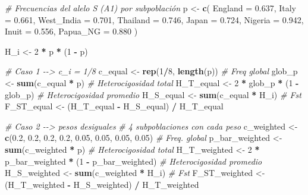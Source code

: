 \documentclass[
  11pt,
]{article}
\newenvironment{Shaded}{\begin{snugshade}}{\end{snugshade}}
\newcommand{\AttributeTok}[1]{\textcolor[rgb]{0.13,0.29,0.53}{#1}}
\newcommand{\CommentTok}[1]{\textcolor[rgb]{0.56,0.35,0.01}{\textit{#1}}}
\newcommand{\DecValTok}[1]{\textcolor[rgb]{0.00,0.00,0.81}{#1}}
\newcommand{\FloatTok}[1]{\textcolor[rgb]{0.00,0.00,0.81}{#1}}
\newcommand{\FunctionTok}[1]{\textcolor[rgb]{0.13,0.29,0.53}{\textbf{#1}}}
\newcommand{\NormalTok}[1]{#1}
\newcommand{\OtherTok}[1]{\textcolor[rgb]{0.56,0.35,0.01}{#1}}
\newcommand{\SpecialCharTok}[1]{\textcolor[rgb]{0.81,0.36,0.00}{\textbf{#1}}}
\begin{document}
\begin{Shaded}
\begin{Highlighting}[]
\CommentTok{\# Frecuencias del alelo S (A1) por subpoblación}
\NormalTok{p }\OtherTok{\textless{}{-}} \FunctionTok{c}\NormalTok{(}
  \AttributeTok{England =} \FloatTok{0.637}\NormalTok{,}
  \AttributeTok{Italy =} \FloatTok{0.661}\NormalTok{,}
  \AttributeTok{West\_India =} \FloatTok{0.701}\NormalTok{,}
  \AttributeTok{Thailand =} \FloatTok{0.746}\NormalTok{,}
  \AttributeTok{Japan =} \FloatTok{0.724}\NormalTok{,}
  \AttributeTok{Nigeria =} \FloatTok{0.942}\NormalTok{,}
  \AttributeTok{Inuit =} \FloatTok{0.556}\NormalTok{,}
  \AttributeTok{Papua\_NG =} \FloatTok{0.880}
\NormalTok{)}

\NormalTok{H\_i }\OtherTok{\textless{}{-}} \DecValTok{2} \SpecialCharTok{*}\NormalTok{ p }\SpecialCharTok{*}\NormalTok{ (}\DecValTok{1} \SpecialCharTok{{-}}\NormalTok{ p)}

\CommentTok{\# Caso 1 {-}{-}\textgreater{} c\_i = 1/8}
\NormalTok{c\_equal }\OtherTok{\textless{}{-}} \FunctionTok{rep}\NormalTok{(}\DecValTok{1}\SpecialCharTok{/}\DecValTok{8}\NormalTok{, }\FunctionTok{length}\NormalTok{(p))}
\CommentTok{\# Freq global}
\NormalTok{glob\_p }\OtherTok{\textless{}{-}} \FunctionTok{sum}\NormalTok{(c\_equal }\SpecialCharTok{*}\NormalTok{ p)}
\CommentTok{\# Heterocigosidad total}
\NormalTok{H\_T\_equal }\OtherTok{\textless{}{-}} \DecValTok{2} \SpecialCharTok{*}\NormalTok{ glob\_p }\SpecialCharTok{*}\NormalTok{ (}\DecValTok{1} \SpecialCharTok{{-}}\NormalTok{ glob\_p)}
\CommentTok{\# Heterocigosidad promedio}
\NormalTok{H\_S\_equal }\OtherTok{\textless{}{-}} \FunctionTok{sum}\NormalTok{(c\_equal }\SpecialCharTok{*}\NormalTok{ H\_i)}
\CommentTok{\# Fst}
\NormalTok{F\_ST\_equal }\OtherTok{\textless{}{-}}\NormalTok{ (H\_T\_equal }\SpecialCharTok{{-}}\NormalTok{ H\_S\_equal) }\SpecialCharTok{/}\NormalTok{ H\_T\_equal}


\CommentTok{\# Caso 2 {-}{-}\textgreater{} pesos desiguales}
\CommentTok{\# 4 subpoblaciones con cada peso}
\NormalTok{c\_weighted }\OtherTok{\textless{}{-}} \FunctionTok{c}\NormalTok{(}\FloatTok{0.2}\NormalTok{, }\FloatTok{0.2}\NormalTok{, }\FloatTok{0.2}\NormalTok{, }\FloatTok{0.2}\NormalTok{, }\FloatTok{0.05}\NormalTok{, }\FloatTok{0.05}\NormalTok{, }\FloatTok{0.05}\NormalTok{, }\FloatTok{0.05}\NormalTok{)}
\CommentTok{\# Freq. global}
\NormalTok{p\_bar\_weighted }\OtherTok{\textless{}{-}} \FunctionTok{sum}\NormalTok{(c\_weighted }\SpecialCharTok{*}\NormalTok{ p)}
\CommentTok{\# Heterocigosidad total}
\NormalTok{H\_T\_weighted }\OtherTok{\textless{}{-}} \DecValTok{2} \SpecialCharTok{*}\NormalTok{ p\_bar\_weighted }\SpecialCharTok{*}\NormalTok{ (}\DecValTok{1} \SpecialCharTok{{-}}\NormalTok{ p\_bar\_weighted)}
\CommentTok{\# Heterocigosidad promedio}
\NormalTok{H\_S\_weighted }\OtherTok{\textless{}{-}} \FunctionTok{sum}\NormalTok{(c\_weighted }\SpecialCharTok{*}\NormalTok{ H\_i)}
\CommentTok{\# Fst}
\NormalTok{F\_ST\_weighted }\OtherTok{\textless{}{-}}\NormalTok{ (H\_T\_weighted }\SpecialCharTok{{-}}\NormalTok{ H\_S\_weighted) }\SpecialCharTok{/}\NormalTok{ H\_T\_weighted}
\end{Highlighting}
\end{Shaded}
\end{document}
